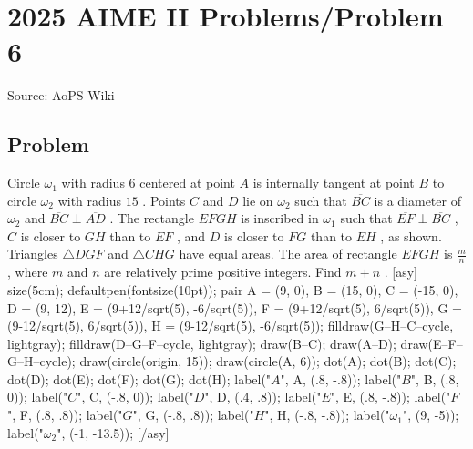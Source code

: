 \documentclass[12pt]{article}
\begin{document}
\section*{{2025 AIME II Problems/Problem 6}}
Source: AoPS Wiki

\subsection*{Problem}
Circle $\omega_1$ with radius $6$ centered at point $A$ is internally tangent at point $B$ to circle $\omega_2$ with radius $15$ . Points $C$ and $D$ lie on $\omega_2$ such that $\overline{BC}$ is a diameter of $\omega_2$ and ${\overline{BC} \perp \overline{AD}}$ . The rectangle $EFGH$ is inscribed in $\omega_1$ such that $\overline{EF} \perp \overline{BC}$ , $C$ is closer to $\overline{GH}$ than to $\overline{EF}$ , and $D$ is closer to $\overline{FG}$ than to $\overline{EH}$ , as shown. Triangles $\triangle {DGF}$ and $\triangle {CHG}$ have equal areas. The area of rectangle $EFGH$ is $\frac{m}{n}$ , where $m$ and $n$ are relatively prime positive integers. Find $m+n$ . [asy] size(5cm); defaultpen(fontsize(10pt)); pair A = (9, 0), B = (15, 0), C = (-15, 0), D = (9, 12), E = (9+12/sqrt(5), -6/sqrt(5)), F = (9+12/sqrt(5), 6/sqrt(5)), G = (9-12/sqrt(5), 6/sqrt(5)), H = (9-12/sqrt(5), -6/sqrt(5)); filldraw(G--H--C--cycle, lightgray); filldraw(D--G--F--cycle, lightgray); draw(B--C); draw(A--D); draw(E--F--G--H--cycle); draw(circle(origin, 15)); draw(circle(A, 6)); dot(A); dot(B); dot(C); dot(D); dot(E); dot(F); dot(G); dot(H); label("$A$", A, (.8, -.8)); label("$B$", B, (.8, 0)); label("$C$", C, (-.8, 0)); label("$D$", D, (.4, .8)); label("$E$", E, (.8, -.8)); label("$F$", F, (.8, .8)); label("$G$", G, (-.8, .8)); label("$H$", H, (-.8, -.8)); label("$\omega_1$", (9, -5)); label("$\omega_2$", (-1, -13.5)); [/asy]
\end{document}
